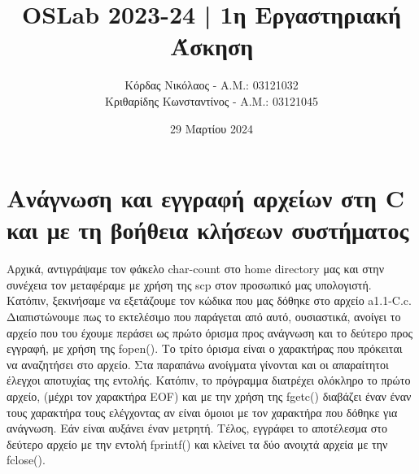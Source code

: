 \documentclass{article}
\title{OSLab 2023-24 | 1η Εργαστηριακή Άσκηση}
\author{Κόρδας Νικόλαος - Α.Μ.: 03121032 \\
	Κριθαρίδης Κωνσταντίνος - Α.Μ.: 03121045}
\date{29 Μαρτίου 2024}
\begin{document}
	\maketitle	
	
	\section{Ανάγνωση και εγγραφή αρχείων στη C και με τη βοήθεια κλήσεων συστήματος}
	Αρχικά, αντιγράψαμε τον φάκελο char-count στο home directory μας και στην συνέχεια τον μεταφέραμε με χρήση της scp στον προσωπικό μας υπολογιστή. Κατόπιν, ξεκινήσαμε να εξετάζουμε τον κώδικα που μας δόθηκε στο αρχείο a1.1-C.c. Διαπιστώνουμε πως το εκτελέσιμο που παράγεται από αυτό, ουσιαστικά, ανοίγει το αρχείο που του έχουμε περάσει ως πρώτο όρισμα προς ανάγνωση και το δεύτερο προς εγγραφή, με χρήση της fopen(). Το τρίτο όρισμα είναι ο χαρακτήρας που πρόκειται να αναζητήσει στο αρχείο. Στα παραπάνω ανοίγματα γίνονται και οι απαραίτητοι έλεγχοι αποτυχίας της εντολής. Κατόπιν, το πρόγραμμα διατρέχει ολόκληρο το πρώτο αρχείο, (μέχρι τον χαρακτήρα EOF) και με την χρήση της fgetc() διαβάζει έναν έναν τους χαρακτήρα τους ελέγχοντας αν είναι όμοιοι με τον χαρακτήρα που δόθηκε για ανάγνωση. Εάν είναι αυξάνει έναν μετρητή. Τέλος, εγγράφει το αποτέλεσμα στο δεύτερο αρχείο με την εντολή fprintf() και κλείνει τα δύο ανοιχτά αρχεία με την fclose(). \\
	
\end{document}

